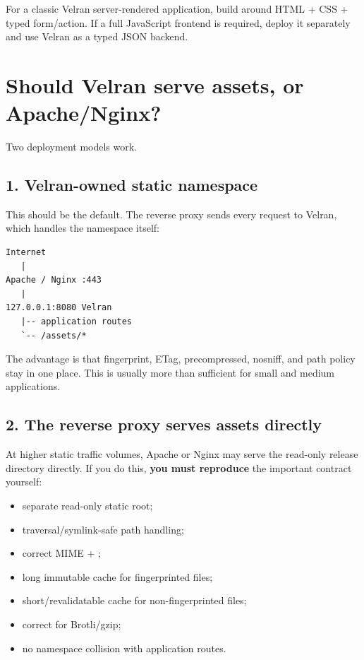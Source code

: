 For a classic Velran server-rendered application, build around HTML + CSS + typed form/action. If a full JavaScript frontend is required, deploy it separately and use Velran as a typed JSON backend.

\section{Should Velran serve assets, or Apache/Nginx?}

Two deployment models work.

\subsection*{1. Velran-owned static namespace}

This should be the default. The reverse proxy sends every request to Velran, which handles the  namespace itself:

\begin{lstlisting}
Internet
   |
Apache / Nginx :443
   |
127.0.0.1:8080 Velran
   |-- application routes
   `-- /assets/*
\end{lstlisting}

The advantage is that fingerprint, ETag, precompressed, nosniff, and path policy stay in one place. This is usually more than sufficient for small and medium applications.

\subsection*{2. The reverse proxy serves assets directly}

At higher static traffic volumes, Apache or Nginx may serve the read-only release  directory directly. If you do this, \textbf{you must reproduce} the important contract yourself:

\begin{itemize}
  \item separate read-only static root;
  \item traversal/symlink-safe path handling;
  \item correct MIME + ;
  \item long immutable cache for fingerprinted files;
  \item short/revalidatable cache for non-fingerprinted files;
  \item correct  for Brotli/gzip;
  \item no namespace collision with application routes.
\end{itemize}

